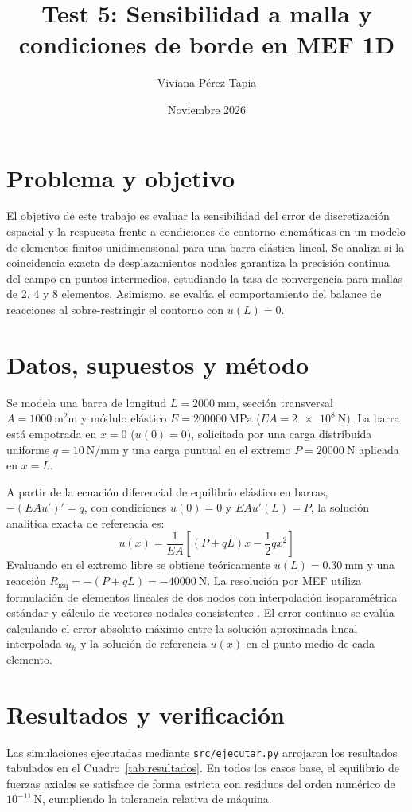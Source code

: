 \documentclass[11pt]{article}
\title{Test 5: Sensibilidad a malla y condiciones de borde en MEF 1D}
\author{Viviana Pérez Tapia}
\date{Noviembre 2026}
\begin{document}
\maketitle

\section{Problema y objetivo}
El objetivo de este trabajo es evaluar la sensibilidad del error de discretización espacial y la respuesta frente a condiciones de contorno cinemáticas en un modelo de elementos finitos unidimensional para una barra elástica lineal. Se analiza si la coincidencia exacta de desplazamientos nodales garantiza la precisión continua del campo en puntos intermedios, estudiando la tasa de convergencia para mallas de 2, 4 y 8 elementos. Asimismo, se evalúa el comportamiento del balance de reacciones al sobre-restringir el contorno con $u(L)=0$.

\section{Datos, supuestos y método}
Se modela una barra de longitud $L = \SI{2000}{\milli\metre}$, sección transversal $A = \SI{1000}{\square\milli\metre}$ y módulo elástico $E = \SI{200000}{\mega\pascal}$ ($EA = \SI{2e8}{\newton}$). La barra está empotrada en $x=0$ ($u(0)=0$), solicitada por una carga distribuida uniforme $q = \SI{10}{\newton\per\milli\metre}$ y una carga puntual en el extremo $P = \SI{20000}{\newton}$ aplicada en $x=L$. 

A partir de la ecuación diferencial de equilibrio elástico en barras, $-(EA u')' = q$, con condiciones $u(0)=0$ y $EA u'(L)=P$, la solución analítica exacta de referencia es:
\begin{equation}
u(x) = \frac{1}{EA}\left[(P + qL)x - \frac{1}{2}qx^2\right]
\label{eq:analitica}
\end{equation}
Evaluando en el extremo libre se obtiene teóricamente $u(L) = \SI{0.30}{\milli\metre}$ y una reacción $R_{\text{izq}} = -(P+qL) = \SI{-40000}{\newton}$. La resolución por MEF utiliza formulación de elementos lineales de dos nodos con interpolación isoparamétrica estándar y cálculo de vectores nodales consistentes \cite{zienkiewicz2005}. El error continuo se evalúa calculando el error absoluto máximo entre la solución aproximada lineal interpolada $u_h$ y la solución de referencia $u(x)$ en el punto medio de cada elemento.

\section{Resultados y verificación}
Las simulaciones ejecutadas mediante \texttt{src/ejecutar.py} arrojaron los resultados tabulados en el Cuadro~\ref{tab:resultados}. En todos los casos base, el equilibrio de fuerzas axiales se satisface de forma estricta con residuos del orden numérico de $10^{-11}\,\unit{\newton}$, cumpliendo la tolerancia relativa de máquina.
\end{document}
